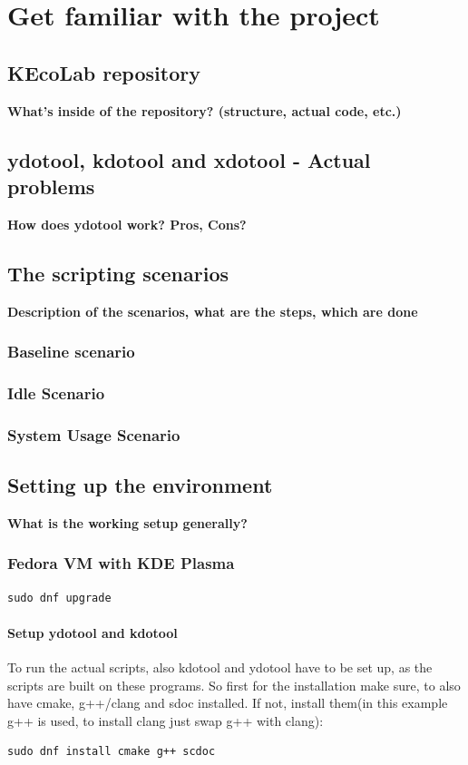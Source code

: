 \chapter{Get familiar with the project}

    \section{KEcoLab repository}
    \textbf{What's inside of the repository? (structure, actual code, etc.)}

    \section{ydotool, kdotool and xdotool - Actual problems}
    \textbf{How does ydotool work? Pros, Cons?}

    \section{The scripting scenarios}
    \textbf{Description of the scenarios, what are the steps, which are done}

    \subsection{Baseline scenario}
    \subsection{Idle Scenario}
    \subsection{System Usage Scenario}

    \section{Setting up the environment}
    \textbf{What is the working setup generally?}

    \subsection{Fedora VM with KDE Plasma}
    \begin{lstlisting}[gobble=8] 
        sudo dnf upgrade
    \end{lstlisting}

    \subsubsection{Setup ydotool and kdotool}
    To run the actual scripts, also kdotool and ydotool have to be set up, as 
    the scripts are built on these programs. So first for the installation 
    make sure, to also have cmake, g++/clang and sdoc installed. If not, 
    install them(in this example g++ is used, to install clang just swap g++ 
    with clang):
    \begin{lstlisting}[gobble=8]
        sudo dnf install cmake g++ scdoc
    \end{lstlisting}

